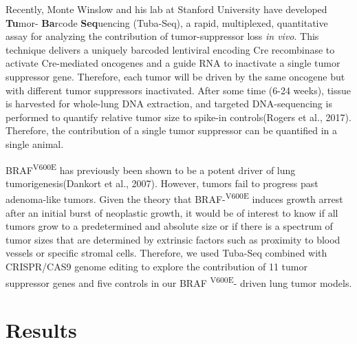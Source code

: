 Recently, Monte Winslow and his lab at Stanford University have developed \textbf{Tu}mor- \textbf{Ba}rcode \textbf{Seq}uencing (Tuba-Seq), a rapid, multiplexed, quantitative assay for analyzing the contribution of tumor-suppressor loss \emph{in vivo}.
This technique delivers a uniquely barcoded lentiviral encoding Cre recombinase to activate Cre-mediated oncogenes and a guide RNA to inactivate a single tumor suppressor gene.
Therefore, each tumor will be driven by the same oncogene but with different tumor suppressors inactivated.
After some time (6-24 weeks), tissue is harvested for whole-lung DNA extraction, and targeted DNA-sequencing is performed to quantify relative tumor size to spike-in controls(Rogers et al., 2017).
Therefore, the contribution of a single tumor suppressor can be quantified in a single animal.

BRAF\textsuperscript{V600E} has previously been shown to be a potent driver of lung tumorigenesis(Dankort et al., 2007).
However, tumors fail to progress past adenoma-like tumors.
Given the theory that BRAF-\textsuperscript{V600E} induces growth arrest after an initial burst of neoplastic growth, it would be of interest to know if all tumors grow to a predetermined and absolute size or if there is a spectrum of tumor sizes that are determined by extrinsic factors such as proximity to blood vessels or specific stromal cells.
Therefore, we used Tuba-Seq combined with CRISPR/CAS9 genome editing to explore the contribution of 11 tumor suppressor genes and five controls in our BRAF \textsuperscript{V600E}- driven lung tumor models.

\hypertarget{results}{%
\section{Results}\label{results}}

